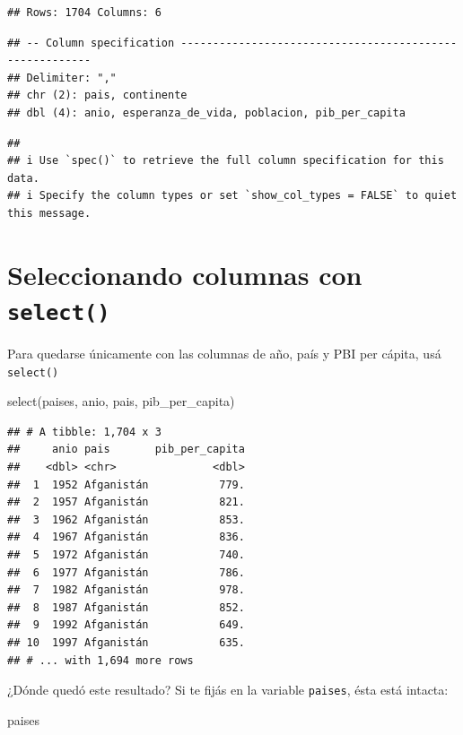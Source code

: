 \documentclass[
  openany]{book}
\newenvironment{Shaded}{\begin{snugshade}}{\end{snugshade}}
\newcommand{\FunctionTok}[1]{\textcolor[rgb]{0.00,0.00,0.00}{#1}}
\newcommand{\NormalTok}[1]{#1}
\begin{document}
\begin{verbatim}
## Rows: 1704 Columns: 6
\end{verbatim}

\begin{verbatim}
## -- Column specification --------------------------------------------------------
## Delimiter: ","
## chr (2): pais, continente
## dbl (4): anio, esperanza_de_vida, poblacion, pib_per_capita
\end{verbatim}

\begin{verbatim}
## 
## i Use `spec()` to retrieve the full column specification for this data.
## i Specify the column types or set `show_col_types = FALSE` to quiet this message.
\end{verbatim}

\hypertarget{seleccionando-columnas-con-select}{%
\section{\texorpdfstring{Seleccionando columnas con \texttt{select()}}{Seleccionando columnas con select()}}\label{seleccionando-columnas-con-select}}

Para quedarse únicamente con las columnas de año, país y PBI per cápita, usá \texttt{select()}

\begin{Shaded}
\begin{Highlighting}[]
\FunctionTok{select}\NormalTok{(paises, anio, pais, pib\_per\_capita)}
\end{Highlighting}
\end{Shaded}

\begin{verbatim}
## # A tibble: 1,704 x 3
##     anio pais       pib_per_capita
##    <dbl> <chr>               <dbl>
##  1  1952 Afganistán           779.
##  2  1957 Afganistán           821.
##  3  1962 Afganistán           853.
##  4  1967 Afganistán           836.
##  5  1972 Afganistán           740.
##  6  1977 Afganistán           786.
##  7  1982 Afganistán           978.
##  8  1987 Afganistán           852.
##  9  1992 Afganistán           649.
## 10  1997 Afganistán           635.
## # ... with 1,694 more rows
\end{verbatim}

¿Dónde quedó este resultado?
Si te fijás en la variable \texttt{paises}, ésta está intacta:

\begin{Shaded}
\begin{Highlighting}[]
\NormalTok{paises}
\end{Highlighting}
\end{Shaded}
\end{document}
